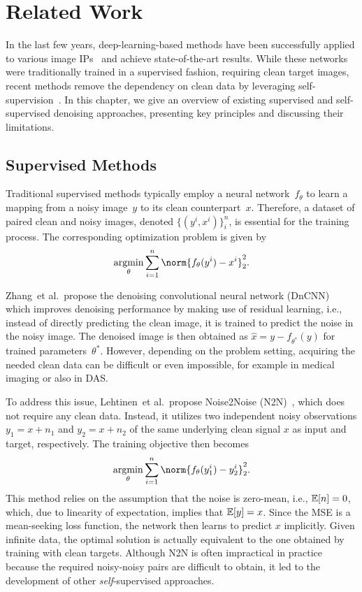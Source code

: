 \chapter{Related Work}

In the last few years, deep-learning-based methods have been successfully applied to various image IPs~\cite{DN,SR,IP} and achieve state-of-the-art results.
While these networks were traditionally trained in a supervised fashion, requiring clean target images, recent methods remove the dependency on clean data by leveraging self-supervision~\cite{SelfSupervisedDenoising}.
In this chapter, we give an overview of existing supervised and self-supervised denoising approaches, presenting key principles and discussing their limitations.

\section{Supervised Methods}

Traditional supervised methods typically employ a neural network~$f_\theta$ to learn a mapping from a noisy image~$y$ to its clean counterpart~$x$.
Therefore, a dataset of paired clean and noisy images, denoted $\{(y^i,x^i)\}_i^n$, is essential for the training process.
The corresponding optimization problem is given by
\begin{equation}\label{eq:N2C}
    \argmin_\theta \sum_{i=1}^{n} \norm{f_\theta(y^i) - x^i}_2^2.
\end{equation}


Zhang~et al.\ propose the denoising convolutional neural network (DnCNN)~\cite{DnCNN} which improves denoising performance by making use of residual learning, i.e., instead of directly predicting the clean image, it is trained to predict the noise in the noisy image.
The denoised image is then obtained as $\hat{x} = y - f_{\theta^*}(y)$ for trained parameters~$\theta^*$.
However, depending on the problem setting, acquiring the needed clean data can be difficult or even impossible, for example in medical imaging or also in DAS\@.

To address this issue, Lehtinen~et al.\ propose Noise2Noise (N2N)~\cite{N2N}, which does not require any clean data.
Instead, it utilizes two independent noisy observations $y_1 = x + n_1$ and $y_2 = x + n_2$ of the same underlying clean signal $x$ as input and target, respectively.
The training objective then becomes
\begin{equation}\label{eq:N2N}
    \argmin_\theta \sum_{i=1}^{n} \norm{f_\theta(y_1^i) - y_2^i}_2^2.
\end{equation}
This method relies on the assumption that the noise is zero-mean, i.e., $\mathbb{E} [n] = 0$, which, due to linearity of expectation, implies that $\mathbb{E} [y] = x$.
Since the MSE is a mean-seeking loss function, the network then learns to predict $x$ implicitly.
Given infinite data, the optimal solution is actually equivalent to the one obtained by training with clean targets.
Although N2N is often impractical in practice because the required noisy-noisy pairs are difficult to obtain, it led to the development of other \textit{self}-supervised approaches.


